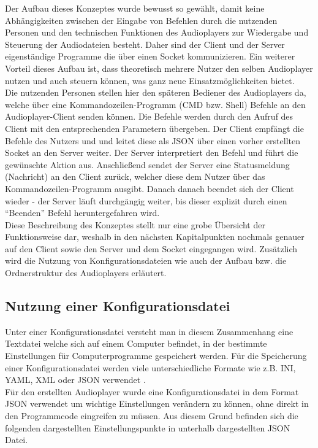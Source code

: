 Der Aufbau dieses Konzeptes wurde bewusst so gewählt, damit keine
Abhängigkeiten zwischen der Eingabe von Befehlen durch die nutzenden Personen
und den technischen Funktionen des Audioplayers zur Wiedergabe und Steuerung
der Audiodateien besteht. Daher sind der Client und der Server eigenständige
Programme die über einen Socket kommunizieren. Ein weiterer Vorteil dieses
Aufbau ist, dass theoretisch mehrere Nutzer den selben Audioplayer nutzen und
auch steuern können, was ganz neue Einsatzmöglichkeiten bietet. \\ 
Die nutzenden Personen stellen hier den späteren Bediener des Audioplayers da,
welche über eine Kommandozeilen-Programm (\ac{CMD} bzw. Shell) Befehle an den
Audioplayer-Client senden können. Die Befehle werden durch den Aufruf des
Client mit den entsprechenden Parametern übergeben. Der Client empfängt die
Befehle des Nutzers und und leitet diese als \ac{JSON} über einen vorher
erstellten Socket an den Server weiter. Der Server interpretiert den Befehl und
führt die gewünschte Aktion aus. Anschließend sendet der Server eine
Statusmeldung (Nachricht) an den Client zurück, welcher diese dem Nutzer über
das Kommandozeilen-Programm ausgibt. Danach danach beendet sich der Client
wieder - der Server läuft durchgängig weiter, bis dieser explizit durch einen
\enquote{Beenden} Befehl heruntergefahren wird. \\ 
Diese Beschreibung des
Konzeptes stellt nur eine grobe Übersicht der Funktionsweise dar, weshalb in
den nächsten Kapitalpunkten nochmals genauer auf den Client sowie den Server
und dem Socket eingegangen wird. Zusätzlich wird die Nutzung von
Konfigurationsdateien wie auch der Aufbau bzw. die Ordnerstruktur des
Audioplayers erläutert.

\subsection{Nutzung einer Konfigurationsdatei}
Unter einer Konfigurationsdatei versteht man in diesem Zusammenhang eine
Textdatei welche sich auf einem Computer befindet, in der bestimmte
Einstellungen für Computerprogramme gespeichert werden. Für die Speicherung
einer Konfigurationsdatei werden viele unterschiedliche Formate wie z.B.
\ac{INI}, \ac{YAML}, \ac{XML} oder \ac{JSON} verwendet
\autocite{hard_coding_and_soft_coding_2019} \autocite{lott_2019}. \\ 
Für den erstellten Audioplayer wurde eine Konfigurationsdatei in dem Format
\ac{JSON} verwendet um wichtige Einstellungen verändern zu können, ohne direkt
in den Programmcode eingreifen zu müssen. Aus diesem Grund befinden sich die
folgenden dargestellten Einstellungspunkte in unterhalb dargestellten \ac{JSON}
Datei. 


